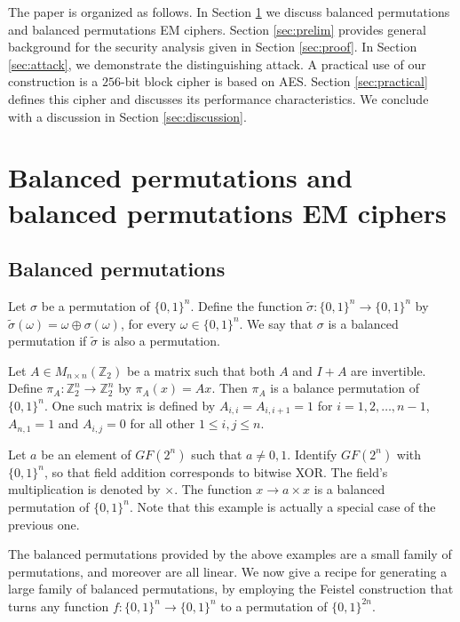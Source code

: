\documentclass{llncs}
\newcommand{\s}{\{0,1\}}
\begin{document}
The paper is organized as follows. In Section \ref{sec:Balanced} we discuss 
balanced permutations and balanced permutations EM ciphers. Section \ref{sec:prelim} provides general background for the security analysis given in Section \ref{sec:proof}. In Section \ref{sec:attack}, we demonstrate the distinguishing attack. 
A practical use of our construction is a $256$-bit block cipher is based on AES. Section \ref{sec:practical} defines this cipher and discusses its performance characteristics. We conclude with a discussion in Section \ref{sec:discussion}.


\section{Balanced permutations and balanced permutations EM ciphers}
\label{sec:Balanced}

\subsection{Balanced permutations}

\begin{definition} Let $\sigma$ be a permutation of $\s^n$. Define the function $\tilde{\sigma}:\s^n\rightarrow\s^n$ by $\tilde{\sigma}(\omega)=\omega\oplus\sigma(\omega)$, for every $\omega\in\s^n$. We say that $\sigma$ is a balanced permutation if $\tilde{\sigma}$ is also a permutation.
\end{definition}

\begin{example}
Let $A\in M_{n\times n}(\mathbb{Z}_2)$ be a matrix such that both $A$ and $I+A$ are invertible. Define $\pi_A:\mathbb{Z}_2^n\to\mathbb{Z}_2^n$ by $\pi_A(x)=Ax$. Then $\pi_A$ is a balance permutation of $\{ 0, 1 \}^n$.
One such matrix is defined by $A_{i,i} = A_{i, i+1} = 1$ for $i=1, 2, \ldots, n-1$, $A_{n, 1} = 1$ and $A_{i, j} = 0$ for all other $1 \le i, j \le n$.
\end{example}

\begin{example}
Let $a$ be an element of $GF(2^n)$ such that $a \ne 0, 1$. Identify $GF(2^n)$ with $\s^n$, so that field addition corresponds to bitwise XOR. The field's multiplication is denoted by $\times$. The function $x \to a \times x$ is a balanced permutation of $\{ 0, 1 \}^n$.
Note that this example is actually a special case of the previous one.
\end{example}
The balanced permutations provided by the above examples are a small family of permutations, and moreover are all linear. We now give a recipe for generating a large family of balanced permutations, by employing the Feistel construction that turns any function $f:\s^n\rightarrow\s^n$ to a permutation of $\s^{2n}$.
\end{document}
